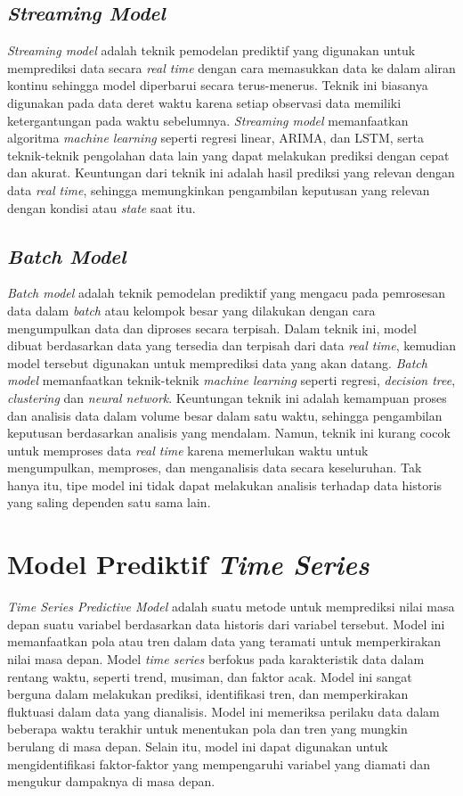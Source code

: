 \subsection{\textit{Streaming Model}}
\textit{Streaming model} adalah teknik pemodelan prediktif yang digunakan untuk memprediksi data secara \textit{real time} dengan cara memasukkan data ke dalam aliran kontinu sehingga model diperbarui secara terus-menerus. Teknik ini biasanya digunakan pada data deret waktu karena setiap observasi data memiliki ketergantungan pada waktu sebelumnya. \textit{Streaming model} memanfaatkan algoritma \textit{machine learning} seperti regresi linear, ARIMA, dan LSTM, serta teknik-teknik pengolahan data lain yang dapat melakukan prediksi dengan cepat dan akurat. Keuntungan dari teknik ini adalah hasil prediksi yang relevan dengan data \textit{real time}, sehingga memungkinkan pengambilan keputusan yang relevan dengan kondisi atau \textit{state} saat itu.

\subsection{\textit{Batch Model}}
\textit{Batch model} adalah teknik pemodelan prediktif yang mengacu pada pemrosesan data dalam \textit{batch} atau kelompok besar yang dilakukan dengan cara mengumpulkan data dan diproses secara terpisah. Dalam teknik ini, model dibuat berdasarkan data yang tersedia dan terpisah dari data \textit{real time}, kemudian model tersebut digunakan untuk memprediksi data yang akan datang. \textit{Batch model} memanfaatkan teknik-teknik \textit{machine learning} seperti regresi, \textit{decision tree}, \textit{clustering} dan \textit{neural network}. Keuntungan teknik ini adalah kemampuan proses dan analisis data dalam volume besar dalam satu waktu, sehingga pengambilan keputusan berdasarkan analisis yang mendalam. Namun, teknik ini kurang cocok untuk memproses data \textit{real time} karena memerlukan waktu untuk mengumpulkan, memproses, dan menganalisis data secara keseluruhan. Tak hanya itu, tipe model ini tidak dapat melakukan analisis terhadap data historis yang saling dependen satu sama lain.

\section{Model Prediktif \textit{Time Series}}
\textit{Time Series Predictive Model} adalah suatu metode untuk memprediksi nilai masa depan suatu variabel berdasarkan data historis dari variabel tersebut. Model ini memanfaatkan pola atau tren dalam data yang teramati untuk memperkirakan nilai masa depan. Model \textit{time series} berfokus pada karakteristik data dalam rentang waktu, seperti trend, musiman, dan faktor acak. Model ini sangat berguna dalam melakukan prediksi, identifikasi tren, dan memperkirakan fluktuasi dalam data yang dianalisis. Model ini memeriksa perilaku data dalam beberapa waktu terakhir untuk menentukan pola dan tren yang mungkin berulang di masa depan. Selain itu, model ini dapat digunakan untuk mengidentifikasi faktor-faktor yang mempengaruhi variabel yang diamati dan mengukur dampaknya di masa depan. \parencite{timeseriesanalysis}

